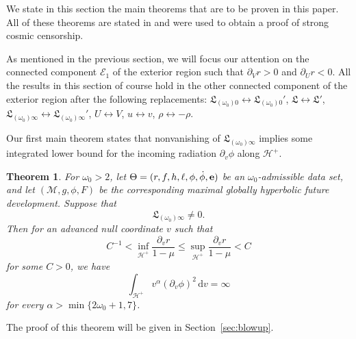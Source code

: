 \documentclass[10pt, reqno]{amsart}
\newtheorem{theorem}{Theorem}[section]
\theoremstyle{definition}
\theoremstyle{remark}
\theoremstyle{conjecture}
\numberwithin{equation}{section}
\newcommand{\ud}{\mathrm{d}}
\newcommand{\rd}{\partial}
\newcommand{\0}{\emptyset}
\newcommand{\alp}{\alpha}
\newcommand{\Tht}{\Theta}
\newcommand{\omg}{\omega}
\newcommand{\bfe}{{\bf e}}
\newcommand{\calH}{\mathcal H}
\newcommand{\calM}{\mathcal M}
\newcommand{\EH}{\calH^{+}}
\newcommand{\e}{\bfe}							%
\newcommand{\Ext}{\mathscr{E}}
\begin{document}
We state in this section the main theorems that are to be proven in this paper. All of these theorems are stated in \cite{LO.interior} and were used to obtain a proof of strong cosmic censorship.

As mentioned in the previous section, we will focus our attention on the connected component $\Ext_{1}$ of the exterior region such that $\rd_V r>0$ and $\rd_U r<0$. All the results in this section of course hold in the other connected component of the exterior region after the following replacements: $\mathfrak{L}_{(\omg_{0}) 0}\leftrightarrow \mathfrak{L}_{(\omg_{0}) 0}'$, $\mathfrak{L}\leftrightarrow \mathfrak{L}'$, $\mathfrak{L}_{(\omg_{0}) \infty}\leftrightarrow \mathfrak{L}_{(\omg_{0}) \infty}'$, $U \leftrightarrow V$, $u\leftrightarrow v$, $\rho \leftrightarrow -\rho$.

Our first main theorem states that nonvanishing of $\mathfrak{L}_{(\omg_{0}) \infty}$ implies some integrated lower bound for the incoming radiation $\rd_{v} \phi$ along $\EH$. 

\begin{theorem} \label{thm:blowup}
For $\omg_{0} > 2$, let $\Tht = (r, f, h, \ell, \phi, \dot{\phi}, \e)$ be an $\omg_{0}$-admissible data set, and let $(\calM, g, \phi, F)$ be the corresponding maximal globally hyperbolic future development. Suppose that
\begin{equation*}
	\mathfrak{L}_{(\omg_{0}) \infty} \neq 0.
\end{equation*}
Then for an advanced null coordinate $v$ such that
\begin{equation*}
	C^{-1} < \inf_{\EH} \frac{\rd_{v} r}{1-\mu} \leq \sup_{\EH} \frac{\rd_{v} r}{1-\mu} < C
\end{equation*}
for some $C > 0$, we have
\begin{equation*}
	\int_{\EH} v^{\alp} (\rd_{v} \phi)^{2} \, \ud v = \infty
\end{equation*}
for every $\alp > \min\{ 2 \omg_{0} + 1 , 7 \}$. 
\end{theorem}

The proof of this theorem will be given in Section~\ref{sec:blowup}.
\end{document}
